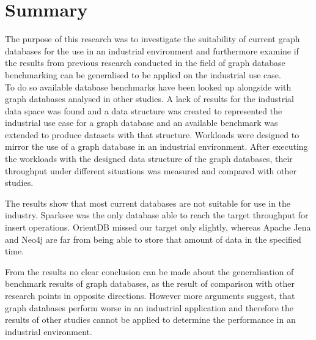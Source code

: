 \section{Summary}
The purpose of this research was to investigate the suitability of current graph databases for the use in an industrial environment and furthermore examine if the results from previous research conducted in the field of graph database benchmarking can be generalised to be applied on the industrial use case.\\
To do so available database benchmarks have been looked up alongside with graph databases analysed in other studies.
A lack of results for the industrial data space was found and a data structure was created to represented the industrial use case for a graph database and an available benchmark was extended to produce datasets with that structure.
Workloads were designed to mirror the use of a graph database in an industrial environment.
After executing the workloads with the designed data structure of the graph databases,
their throughput under different situations was measured and compared with other studies.

The results show that most current databases are not suitable for use in the industry.
Sparksee was the only database able to reach the target throughput for insert operations.
OrientDB missed our target only slightly,
whereas Apache Jena and Neo4j are far from being able to store that amount of data in the specified time.

From the results no clear conclusion can be made about the generalisation of benchmark results of graph databases,
as the result of comparison with other research points in opposite directions.
However more arguments suggest,
that graph databases perform worse in an industrial application and therefore the results of other studies cannot be applied to determine the performance in an industrial environment.
